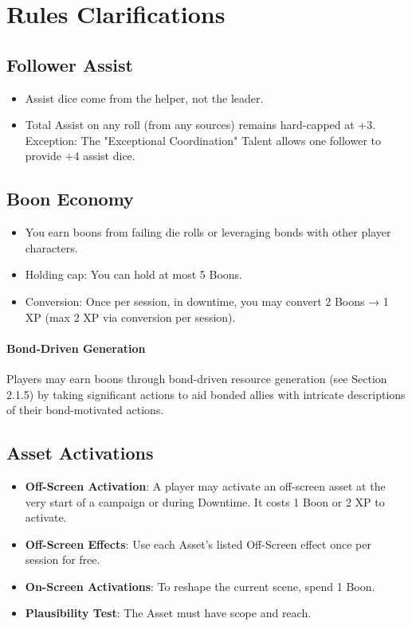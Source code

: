 \documentclass[11pt]{article}
\begin{document}
\section{Rules Clarifications}

\subsection{Follower Assist}
\begin{itemize}
    \item Assist dice come from the helper, not the leader.
    \item Total Assist on any roll (from any sources) remains hard-capped at +3. Exception: The "Exceptional Coordination" Talent allows one follower to provide +4 assist dice.
\end{itemize}

\subsection{Boon Economy}
\begin{itemize}
    \item You earn boons from failing die rolls or leveraging bonds with other player characters.
    \item Holding cap: You can hold at most 5 Boons.
    \item Conversion: Once per session, in downtime, you may convert 2 Boons → 1 XP (max 2 XP via conversion per session).
\end{itemize}

\paragraph{Bond-Driven Generation}
Players may earn boons through bond-driven resource generation (see Section 2.1.5) by taking significant actions to aid bonded allies with intricate descriptions of their bond-motivated actions.

\subsection{Asset Activations}
\begin{itemize}
    \item \textbf{Off-Screen Activation}: A player may activate an off-screen asset at the very start of a campaign or during Downtime. It costs 1 Boon or 2 XP to activate.
    \item \textbf{Off-Screen Effects}: Use each Asset's listed Off-Screen effect once per session for free.
    \item \textbf{On-Screen Activations}: To reshape the current scene, spend 1 Boon.
    \item \textbf{Plausibility Test}: The Asset must have scope and reach.
\end{itemize}
\end{document}
